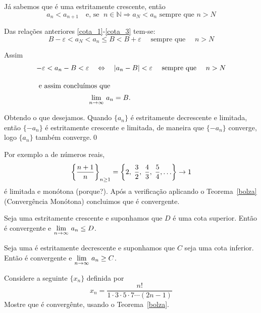 J\'{a} sabemos que  \'{e} uma \seq estritamente crescente, ent\~{a}o
\begin{equation}\label{cota_3}
  a_n< a_{n+1}\quad \text{e,  se }\; n\in \mathbb{N}\Rightarrow a_N< a_n \text{ sempre que } n> N
\end{equation}

Das rela\c{c}\~{o}es anteriores \eqref{cota_1}-\eqref{cota_3} tem-se:
\begin{equation*}
  B-\varepsilon<a_N<a_n\leq B <B+\varepsilon\quad \text{ sempre que }\quad n> N
\end{equation*}

Assim
\begin{align*}
 -\varepsilon<a_n-B<\varepsilon  & \quad \Leftrightarrow \quad |a_n-B|<\varepsilon \quad \text{ sempre que }\quad n> N\\[2ex]
  \intertext{ e assim concluímos que }\quad &\displaystyle{\lim_{n\to \infty}\,{a}_{n}}=B.
\end{align*}

Obtendo o que desejamos. Quando $\{a_n\}$ \'{e} estritamente decrescente
e limitada, ent\~{a}o $\{-a_n\}$ \'{e} estritamente crescente e limitada, de
maneira que $\{-a_n\}$ converge, logo $\{a_n\}$ tamb\'{e}m converge.\qed

Por exemplo a \seq de n\'{u}meros reais,
$$
\displaystyle{\left\{\frac{n+1}{n}\right\}_{n\geq 1}}=\left\{2,\; \frac{3}{2},\; \frac{4}{3},\; \frac{5}{4},\ldots    \right\}\rightarrow 1
$$
\'{e} limitada e mon\'{o}tona (porque?). Ap\'{o}s a verifica\c{c}\~{a}o  aplicando o
Teorema~\ref{bolza} (Converg\^{e}ncia Mon\'{o}tona) concluimos que \'{e} convergente.


\begin{obs}
Seja uma \seq {} estritamente crescente e suponhamos
que $D$ \'{e} uma cota superior. Ent\~{a}o  \'{e} convergente e
$\displaystyle{\lim_{n\to \infty}\,{a}_{n}}\leq D$.
\end{obs}

\begin{obs}
Seja uma \seq {} \'{e} estritamente decrescente e
suponhamos que $C$ seja uma cota inferior. Ent\~{a}o  \'{e}
convergente e $\displaystyle{\lim_{n\to \infty}\,{a}_{n}}\geq C$.
\end{obs}

\begin{exer}
Considere a seguinte \seq $\{x_n\}$ definida por
\begin{equation*}
  x_n =\frac{n!}{1\cdot 3\cdot 5\cdot 7\cdots (2n-1) }
\end{equation*}
Mostre que \'{e} converg\^{e}nte, usando o Teorema~\ref{bolza}.
\end{exer}

